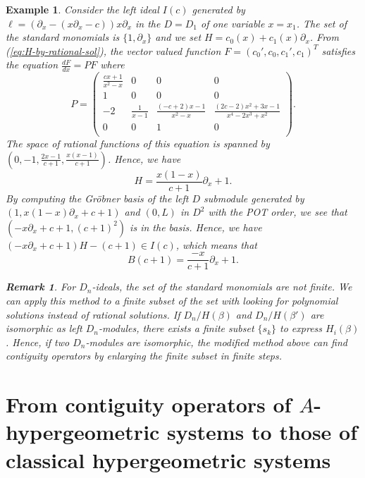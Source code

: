 \documentclass{article}
\def\pd#1{\partial_{#1}}
\newtheorem{example}{Example}
\newtheorem{remark}{Remark}
\begin{document}
\begin{example}\rm  \label{ex:by-rational-sol}
Consider the left ideal $I(c)$ generated by
$ \ell = (\pd{x} - (x \pd{x}-c)) x \pd{x} $ in the $D=D_1$ of one variable $x=x_1$.
The set of the standard monomials is $\{1, \pd{x}\}$ and
we set $H=c_0(x) + c_1(x) \pd{x}$.
From (\ref{eq:H-by-rational-sol}), the vector valued function
$F=(c_0',c_0,c_1',c_1)^T$ satisfies the equation
$\frac{dF}{dx}=P F$
where
$$ P=
\left(\begin{array}{cccc}
\frac{   {c}  {x}+ 1}{   {x}^{ 2} - {x}}& 0& 0& 0 \\
 1& 0& 0& 0 \\
 - 2& \frac{ 1}{  {x}- 1}& \frac{   (  - {c}+ 2)  {x}- 1}{   {x}^{ 2} - {x}}& \frac{    (   2  {c}- 2)   {x}^{ 2} +  3  {x}- 1}{    {x}^{ 4} -  2   {x}^{ 3} +  {x}^{ 2} } \\
0& 0&  1& 0 \\
\end{array}\right).
$$
The space of rational functions of this equation is spanned by
$(0,-1,\frac{2x-1}{c+1},\frac{x(x-1)}{c+1})$.
Hence, we have
\begin{equation}
H=\frac{x(1-x)}{c+1}\pd{x}+1.
\end{equation}
By computing the Gr\"obner basis of the left $D$ submodule
generated by $(1,x(1-x)\pd{x}+c+1)$ and $(0,L)$ in $D^2$
with the POT order,
we see that $(-x\pd{x}+c+1,(c+1)^2)$ is in the basis.
Hence, we have
$ (-x \pd{x}+c+1) H - (c+1) \in I(c)$,
which means that
\begin{equation}
B(c+1)=\frac{-x}{c+1}\pd{x} + 1.
\end{equation}

\begin{remark}\rm
For $D_n$-ideals, the set of the standard monomials are not finite.
We can apply this method to a finite subset of the set
with looking for polynomial solutions instead of rational solutions.
If $D_n/H(\beta)$ and $D_n/H(\beta')$ are isomorphic as left $D_n$-modules,
there exists a finite subset $\{ s_k \}$
to express $H_i(\beta)$.
Hence, if two $D_n$-modules are isomorphic,
the modified method above can find contiguity operators
by enlarging the finite subset in finite steps.
\end{remark}

\end{example}

\section{From contiguity operators of $A$-hypergeometric systems to those of classical hypergeometric systems} \label{sec:restriction_of_A_hg}
\end{document}
